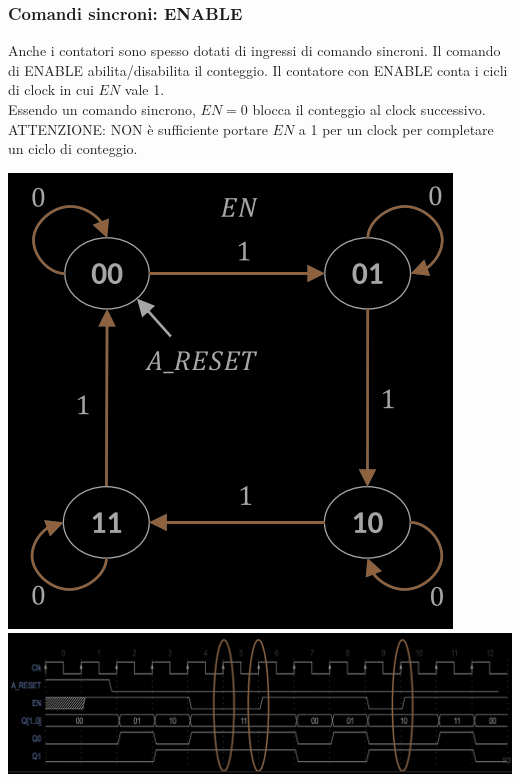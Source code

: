 \documentclass{article}
\begin{document}
\subsubsection{Comandi sincroni: ENABLE}
Anche i contatori sono spesso dotati di ingressi di comando sincroni. Il comando di ENABLE abilita/disabilita il conteggio. Il contatore con ENABLE conta i cicli di clock in cui $EN$ vale 1.\\
Essendo un comando sincrono, $EN=0$ blocca il conteggio al clock successivo.\\
ATTENZIONE: NON è sufficiente portare $EN$ a 1 per un clock per completare un ciclo di conteggio.
\begin{center}
    \includegraphics[scale=0.35]{enable.png}
    \includegraphics[scale=0.35]{grafico enable.png}
\end{center}
\end{document}
